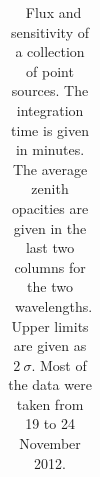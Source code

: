 \begin{table}
\begin{center}
\begin{tabular}{lllrrrrr}
\end{tabular}
\end{center}
\caption{\NIKA\ Flux and sensitivity of a collection of point sources. 
The integration time is given in minutes. 
The average zenith opacities are given in the last two columns for the two
\NIKA\ wavelengths. 
Upper limits are given as $2~\sigma$. 
Most of the data were taken from 19 to 24 November 2012. 
}
\label{tab:table_sed}
\end{table}

